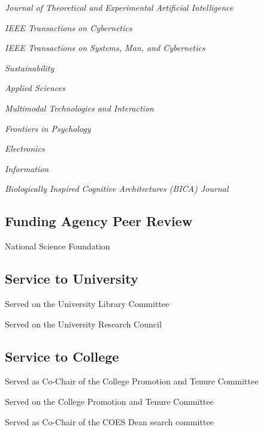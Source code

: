 \documentclass[12pt,letterpaper]{report}
\newcommand{\listitemspace}{0.25em}
\renewenvironment{itemize}
{\begin{list}{}{\setlength{\leftmargin}{0em}
                \setlength{\parskip}{0em}
                \setlength{\itemsep}{\listitemspace}
                \setlength{\parsep}{\listitemspace}}}
{\end{list}}
\begin{document}
    \begin{itemize}
        \item \textit{Journal of Theoretical and Experimental Artificial Intelligence}
        \item \textit{IEEE Transactions on Cybernetics}
        \item \textit{IEEE Transactions on Systems, Man, and Cybernetics}
        \item \textit{Sustainability}
        \item \textit{Applied Sciences}
        \item \textit{Multimodal Technologies and Interaction}
        \item \textit{Frontiers in Psychology}
        \item \textit{Electronics}
        \item \textit{Information}
        \item \textit{Biologically Inspired Cognitive Architectures (BICA) Journal}
    \end{itemize}

    \subsection*{Funding Agency Peer Review}

    \begin{itemize}

        \item National Science Foundation

    \end{itemize}

    \subsection*{Service to University}

    \begin{itemize}
        \item Served on the University Library Committee
        \item Served on the University Research Council
    \end{itemize}

    \subsection*{Service to College}

    \begin{itemize}
        \item Served as Co-Chair of the College Promotion and Tenure Committee
        \item Served on the College Promotion and Tenure Committee
        \item Served as Co-Chair of the COES Dean search committee
    \end{itemize}
\end{document}
